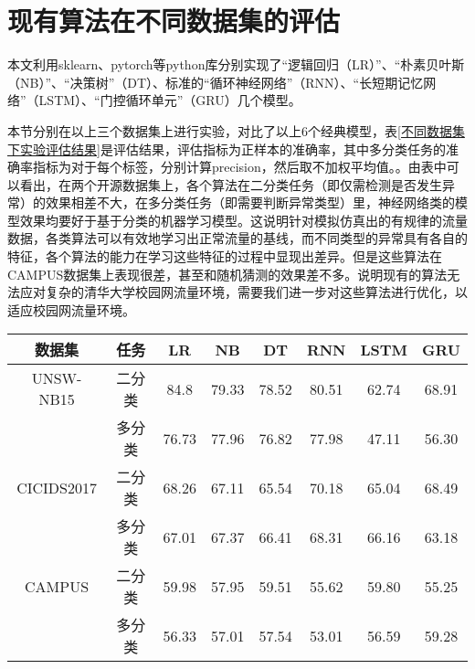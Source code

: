 \section{现有算法在不同数据集的评估}
本文利用sklearn、pytorch等python库分别实现了“逻辑回归（LR）”、“朴素贝叶斯（NB）”、“决策树”（DT）、标准的“循环神经网络”（RNN）、“长短期记忆网络”（LSTM）、“门控循环单元”（GRU）几个模型。

本节分别在以上三个数据集上进行实验，对比了以上6个经典模型，表\ref{不同数据集下实验评估结果}是评估结果，评估指标为正样本的准确率，其中多分类任务的准确率指标为对于每个标签，分别计算precision，然后取不加权平均值。。由表中可以看出，在两个开源数据集上，各个算法在二分类任务（即仅需检测是否发生异常）的效果相差不大，在多分类任务（即需要判断异常类型）里，神经网络类的模型效果均要好于基于分类的机器学习模型。这说明针对模拟仿真出的有规律的流量数据，各类算法可以有效地学习出正常流量的基线，而不同类型的异常具有各自的特征，各个算法的能力在学习这些特征的过程中显现出差异。但是这些算法在CAMPUS数据集上表现很差，甚至和随机猜测的效果差不多。说明现有的算法无法应对复杂的清华大学校园网流量环境，需要我们进一步对这些算法进行优化，以适应校园网流量环境。




\begin{table*}[t]
    \small
    \caption{不同数据集下实验评估结果}
    \label{不同数据集下实验评估结果}
    \centering
    \begin{tabular}{c|c|ccc|ccc}
    \toprule
    
     数据集 &  任务  &  
     LR &  NB & DT & RNN & LSTM & GRU  \\
    \midrule
    
    UNSW-NB15 & 二分类 & 84.8 & 79.33 & 78.52 &  80.51 & 62.74 & 68.91  \\ 
    
    & 多分类 &76.73 & 77.96 & 76.82 & 77.98 & 47.11 & 56.30  \\
    
    \midrule
    CICIDS2017 & 二分类 & 68.26 & 67.11 & 65.54 & 70.18 & 65.04 & 68.49  \\
    & 多分类 & 67.01 & 67.37 & 66.41 & 68.31 & 66.16 & 63.18 \\
    \midrule
    CAMPUS & 二分类 & 59.98 & 57.95 & 59.51 & 55.62 & 59.80 & 55.25 \\
    & 多分类 & 56.33 & 57.01 & 57.54 & 53.01 & 56.59 & 59.28 \\
   
     \bottomrule
    
    \end{tabular}
    \end{table*}
